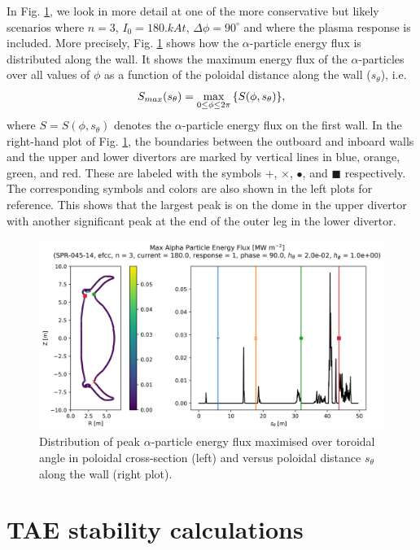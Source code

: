 \documentclass[10pt, a4paper, twoside]{article}
\begin{document}
In Fig. \ref{fig:energy_flux_distribution}, we look in more detail at one of the more conservative but likely scenarios where $n=3$, $I_0= 180\si{.kAt}$, $\Delta \phi = 90^\circ$ and where the plasma response is included. More precisely, Fig. \ref{fig:energy_flux_distribution} shows how the $\alpha$-particle energy flux is distributed along the wall. It shows the maximum energy flux of the $\alpha$-particles over all values of $\phi$ as a function of the poloidal distance along the wall ($s_\theta$), i.e.
\begin{equation}
    S_{max}(s_\theta) = \max_{0\le \phi \le 2\pi}\qty{S(\phi, s_\theta)},
\end{equation}
where $S=S(\phi, s_\theta)$ denotes the $\alpha$-particle energy flux on the first wall.
In the right-hand plot of Fig. \ref{fig:energy_flux_distribution}, the boundaries between the outboard and inboard walls and the upper and lower divertors are marked by vertical lines in blue, orange, green, and red. These are labeled with the symbols +, $\times$, $\bullet$, and $\blacksquare$ respectively. The corresponding symbols and colors are also shown in the left plots for reference. This shows that the largest peak is on the dome in the upper divertor with another significant peak at the end of the outer leg in the lower divertor.

\begin{figure}[!htb]
    \centering
    \includegraphics[width=0.7\linewidth]{Figures/simple_line_plot_no_confidence_band.png}
    \caption{Distribution of peak $\alpha$-particle energy flux maximised over toroidal angle in poloidal cross-section (left) and versus poloidal distance $s_\theta$ along the wall (right plot).}
    \label{fig:energy_flux_distribution}
\end{figure}

\section{TAE stability calculations}
\label{sec:halo_work}
\end{document}
